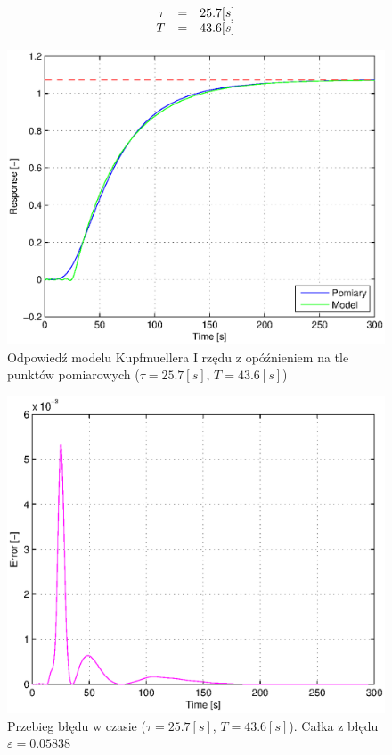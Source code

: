 \documentclass[12pt]{article}
\begin{document}
\begin{equation}
\begin{array}{r c l}
	\tau&=&25.7[s] \\
	T&=&43.6[s] 
\end{array}
\label{equ:paramkup1}
\end{equation}

\begin{figure}[!htp]
	\begin{center}
		\includegraphics[width=13cm]{../res/img/step11.eps}
	\end{center} 
	\caption{Odpowiedź modelu Kupfmuellera I rzędu z opóźnieniem na tle punktów
	pomiarowych ($\tau=25.7[s]$, $T=43.6[s]$)}
\end{figure}

\begin{figure}[!htp]
	\begin{center}
		\includegraphics[width=13cm]{../res/img/err11.eps}
	\end{center} 
	\caption{Przebieg błędu w czasie ($\tau=25.7[s]$, $T=43.6[s]$). Całka z błędu
	$\varepsilon=0.05838$}
\end{figure}
\end{document}
